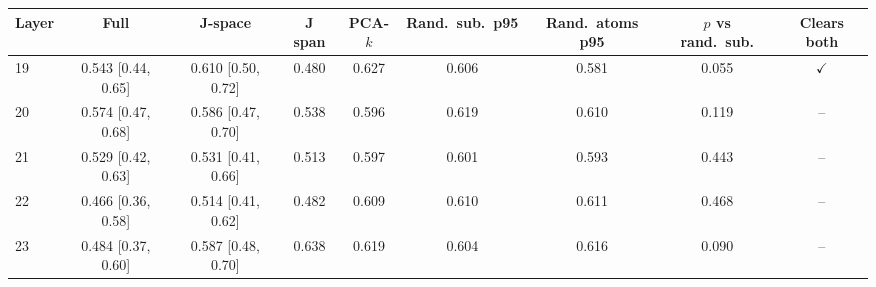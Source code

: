 \begin{tabular}{lcccccccc}\toprule
Layer & Full & J-space & J span & PCA-$k$ & Rand.\ sub.\ p95 & Rand.\ atoms p95 & $p$ vs rand.\ sub. & Clears both\\\midrule
19 & 0.543 [0.44, 0.65] & 0.610 [0.50, 0.72] & 0.480 & 0.627 & 0.606 & 0.581 & 0.055 & $\checkmark$\\
20 & 0.574 [0.47, 0.68] & 0.586 [0.47, 0.70] & 0.538 & 0.596 & 0.619 & 0.610 & 0.119 & --\\
21 & 0.529 [0.42, 0.63] & 0.531 [0.41, 0.66] & 0.513 & 0.597 & 0.601 & 0.593 & 0.443 & --\\
22 & 0.466 [0.36, 0.58] & 0.514 [0.41, 0.62] & 0.482 & 0.609 & 0.610 & 0.611 & 0.468 & --\\
23 & 0.484 [0.37, 0.60] & 0.587 [0.48, 0.70] & 0.638 & 0.619 & 0.604 & 0.616 & 0.090 & --\\
\bottomrule\end{tabular}
